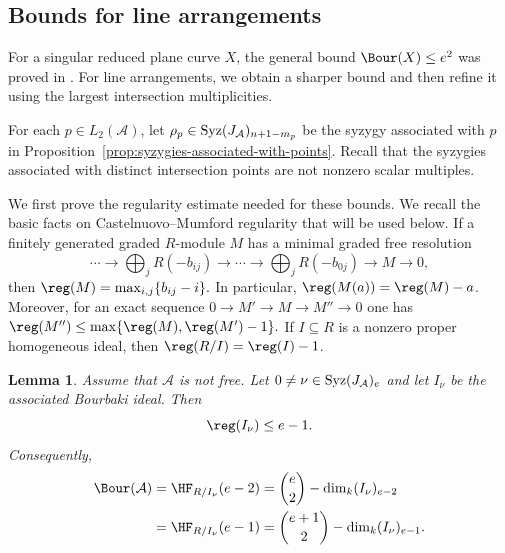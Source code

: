 \documentclass[11pt]{amsart}   %
\newtheorem{Lemma}[Theorem]{Lemma}
\theoremstyle{definition}
\def\syz{\mbox{\rm Syz}}
\def\A{{\mathcal A}}
\begin{document}
\subsection{Bounds for line arrangements}
\label{subsec:bounds-line-arrangements}

For a singular reduced plane curve $X$, the general bound $\Bour(X)\leq e^2$ was proved in \cite[Theorem~2.10]{JNSBourbaki}. For line arrangements, we obtain a sharper bound and then refine it using the largest intersection multiplicities.

For each $p\in L_2(\A)$, let $\rho_p\in\syz(J_\A)_{n+1-m_p}$ be the syzygy associated with $p$ in Proposition~\ref{prop:syzygies-associated-with-points}. Recall that the syzygies associated with distinct intersection points are not nonzero scalar multiples.

We first prove the regularity estimate needed for these bounds. We recall the basic facts on Castelnuovo--Mumford regularity that will be used below. If a finitely generated graded $R$-module $M$ has a minimal graded free resolution
\[
\cdots\longrightarrow\bigoplus_jR(-b_{ij}) \longrightarrow\cdots\longrightarrow \bigoplus_jR(-b_{0j})\longrightarrow M\longrightarrow0,
\]
then $\reg(M)=\max_{i,j}\{b_{ij}-i\}.$ In particular, $\reg(M(a))=\reg(M)-a$. Moreover, for an exact sequence $0\to M'\to M\to M''\to0$ one has $\reg(M'')\leq\max\{\reg(M),\reg(M')-1\}.$ If $I\subseteq R$ is a nonzero proper homogeneous ideal, then $\reg(R/I)=\reg(I)-1$.

\begin{Lemma}
\label{lem:regularity-bourbaki-ideal}
Assume that $\A$ is not free. Let $0\neq\nu\in\syz(J_\A)_e$ and let $I_\nu$ be the associated Bourbaki ideal. Then
\[
\reg(I_\nu)\leq e-1.
\]
Consequently,
\begin{equation}
\label{eq:bourbaki-postulation-degrees}
\begin{aligned}
\Bour(\A)
&=\HF_{R/I_\nu}(e-2)
=\binom e2-\dim_k(I_\nu)_{e-2}\\
&=\HF_{R/I_\nu}(e-1)
=\binom{e+1}{2}-\dim_k(I_\nu)_{e-1}.
\end{aligned}
\end{equation}
\end{Lemma}
\end{document}
